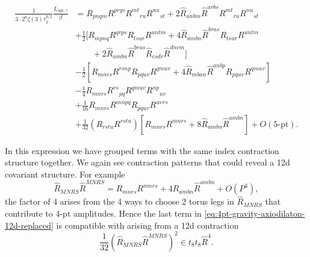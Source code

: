 \begin{equation}
\begin{aligned}
\frac{1}{3 \cdot 2^{8}\zeta(3) \tau_2^{3/2}}\frac{L_{\text{4pt},\tau}}{\beta}
&=
R_{pnqm} R^{prqs} R^{mt}{}_{ru} R^{nu}{}_{st}
+ 2 \widehat{R}_{anbm} \widehat{R}^{arbs} R^{mt}{}_{ru} R^{nu}{}_{st}\\
& + \frac{1}{2}\Big[ R_{mpnq} R^{qrps} R_{tsur} R^{untm}
+ 4 \widehat{R}_{ambn} \widehat{R}^{bras} R_{tsur} R^{untm}\\
&\qquad + 2 \widehat{R}_{ambn} \widehat{R}^{bras} \widehat{R}_{csdr} \widehat{R}^{dncm}\Big]\\
& - \frac{1}{2}\left[ R_{mnrs} R^{rsnp} R_{pquv} R^{qmuv}
 + 4 \widehat{R}_{mban} \widehat{R}^{anbp} R_{pquv} R^{qmuv} \right]\\
& - \frac{1}{4} R_{mnrs} R^{rs}{}_{pq} R^{qmuv} R^{np}{}_{uv}\\
& + \frac{1}{16} R_{mnrs} R^{mnpq} R_{pquv} R^{uvrs}\\
& + \frac{1}{32}(R_{rstu} R^{rstu})
\left[R_{mnrs} R^{mnrs}+ 8 \widehat{R}_{ambn} \widehat{R}^{ambn}\right]+ O(\text{5-pt}).
\end{aligned}
\label{eq:4pt-gravity-axiodilaton-12d-replaced}
\end{equation}

In this expression we have grouped terms with the same index contraction structure together. 
We again see contraction patterns that could reveal a 12d covariant structure.
For example
\begin{equation}
\widehat{R}_{MNRS}\widehat{R}^{MNRS} = R_{mnrs} R^{mnrs} + 4 \widehat{R}_{ambn} \widehat{R}^{ambn} + O(P^3),
\end{equation}
the factor of 4 arises from the 4 ways to choose 2 torus legs in $\widehat{R}_{MNRS}$ that contribute to 4-pt amplitudes.
Hence the last term in \eqref{eq:4pt-gravity-axiodilaton-12d-replaced} is compatible with arising from a 12d contraction 
\begin{equation}
\frac{1}{32} (\widehat{R}_{MNRS} \widehat{R}^{MNRS})^2 \in t_8 t_8 \widehat{R}^4.
\end{equation}

